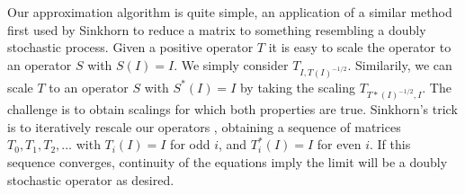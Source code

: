 \documentclass[12pt]{article}
\begin{document}

Our approximation algorithm is quite simple, an application of a similar method first used by Sinkhorn to reduce a matrix to something resembling a doubly stochastic process. Given a positive operator $T$ it is easy to scale the operator to an operator $S$ with $S(I) = I$. We simply consider $T_{I, T(I)^{-1/2}}$. Similarily, we can scale $T$ to an operator $S$ with $S^*(I) = I$ by taking the scaling $T_{T*(I)^{-1/2}, I}$. The challenge is to obtain scalings for which both properties are true. Sinkhorn's trick is to iteratively rescale our operators , obtaining a sequence of matrices $T_0, T_1, T_2, \dots$ with $T_i(I) = I$ for odd $i$, and $T_i^*(I) = I$ for even $i$. If this sequence converges, continuity of the equations imply the limit will be a doubly stochastic operator as desired.
\end{document}
